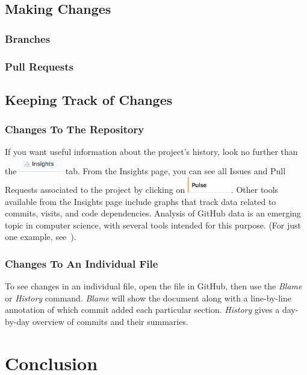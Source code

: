 \documentclass[11pt]{article}
\begin{document}
\subsection{Making Changes}

\hypertarget{branch-section}{\subsubsection{Branches}}


\subsubsection{Pull Requests}

\subsection{Keeping Track of Changes}

\subsubsection{Changes To The Repository} 

If you want useful information about the project's history, look no further than the \includegraphics[width=0.75in]{Insights} tab. From the Insights page, you can see all Issues and Pull Requests associated to the project by clicking on  \includegraphics[width=0.75in]{Pulse}. Other tools available from the Insights page include graphs that track data related to commits, visits, and code dependencies. Analysis of GitHub data is an emerging topic in computer science, with several tools intended for this purpose. (For just one example, see~\cite{github-gender-study}). 

\subsubsection{Changes To An Individual File}

To see changes in an individual file, open the file in GitHub, then use the \textit{Blame} or \textit{History} command. \textit{Blame} will show the document along with a line-by-line annotation of which commit added each particular section. \textit{History} gives a day-by-day overview of commits and their summaries. 

\section{Conclusion}



\end{document}

